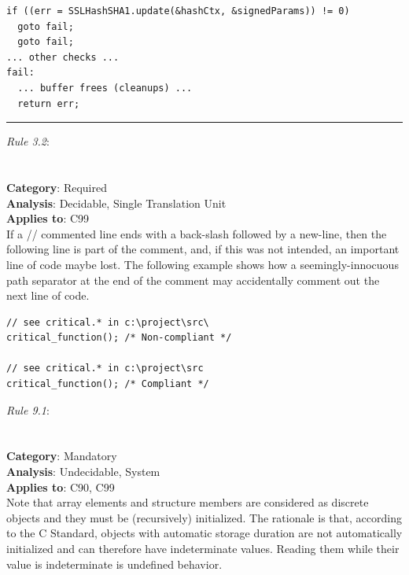 \begin{lstlisting}[caption={The Apple goto fail vulnerability}, label={lst:the-apple-goto-fail-vuln}]
if ((err = SSLHashSHA1.update(&hashCtx, &signedParams)) != 0)
  goto fail;
  goto fail;
... other checks ...
fail:
  ... buffer frees (cleanups) ...
  return err;
\end{lstlisting}

\noindent\rule{\textwidth}{0.1pt}

\emph{Rule 3.2}:\\

\noindent{}
\\\\
\textbf{Category}: Required\\
\textbf{Analysis}: Decidable, Single Translation Unit\\
\textbf{Applies to}: C99\\

If a // commented line ends with a back-slash followed by a new-line, then the following line is part of the comment, and, if this was not intended, an important line of code maybe lost. 
The following example shows how a seemingly-innocuous path separator at the end of the comment may accidentally comment out the next line of code. \cite{BagnaraBH18}

\begin{lstlisting}[caption={Examples of MISRA C 2012 Rule 3.2 violation and compliance}]
// see critical.* in c:\project\src\
critical_function(); /* Non-compliant */

// see critical.* in c:\project\src
critical_function(); /* Compliant */
\end{lstlisting}

\clearpage

\emph{Rule 9.1}:\\

\noindent{}
\\\\
\textbf{Category}: Mandatory\\
\textbf{Analysis}: Undecidable, System\\
\textbf{Applies to}: C90, C99\\

Note that array elements and structure members are considered as discrete objects and they must be (recursively) initialized. 
The rationale is that, according to the C Standard, objects with automatic storage duration are not automatically initialized and can therefore have indeterminate values. Reading them while their value is indeterminate is undefined behavior. \cite{BagnaraBH18}

